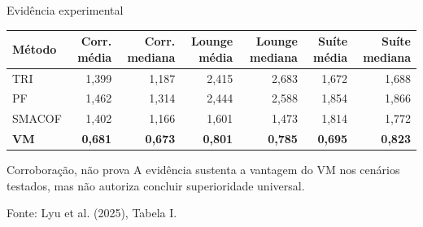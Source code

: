 \documentclass[aspectratio=169,11pt]{beamer}
\newcommand{\slidecite}[1]{%
  \vfill
  {\color{mutedText}\footnotesize\raggedright Fonte: #1\par}
}
\begin{document}
\begin{frame}{Evidência experimental}
  \footnotesize
  \setlength{\tabcolsep}{2pt}
  \renewcommand{\arraystretch}{0.95}
  \begin{tabular}{lrrrrrr}
    \toprule
    Método & Corr. média & Corr. mediana & Lounge média & Lounge mediana & Suíte média & Suíte mediana \\
    \midrule
    TRI & 1,399 & 1,187 & 2,415 & 2,683 & 1,672 & 1,688 \\
    PF & 1,462 & 1,314 & 2,444 & 2,588 & 1,854 & 1,866 \\
    SMACOF & 1,402 & 1,166 & 1,601 & 1,473 & 1,814 & 1,772 \\
    \textbf{VM} & \textbf{0,681} & \textbf{0,673} & \textbf{0,801} & \textbf{0,785} & \textbf{0,695} & \textbf{0,823} \\
    \bottomrule
  \end{tabular}

  \vspace{0.30cm}
  \begin{block}{Corroboração, não prova}
    A evidência sustenta a vantagem do VM nos cenários testados, mas não autoriza concluir superioridade universal.
  \end{block}

  \slidecite{Lyu et al. (2025), Tabela I.}
\end{frame}
\end{document}
